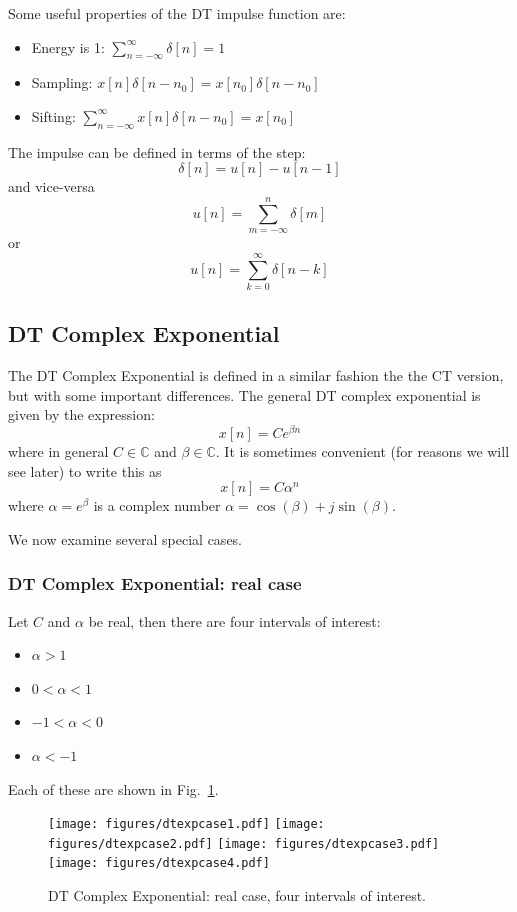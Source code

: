 Some useful properties of the DT impulse function are:

\begin{itemize}
\item Energy is 1: $\sum\limits_{n=-\infty}^{\infty} \delta[n] = 1$
\item Sampling: $x[n]\delta[n-n_0] = x[n_0]\delta[n-n_0]$
\item Sifting: $\sum\limits_{n=-\infty}^{\infty} x[n]\delta[n-n_0] = x[n_0]$
\end{itemize}

The impulse can be defined in terms of the step:
\[
\delta[n] = u[n] - u[n-1]
\]
and vice-versa
\[
u[n] = \sum\limits_{m=-\infty}^{n} \delta[m]
\]
or
\[
u[n] = \sum\limits_{k=0}^{\infty} \delta[n-k]
\]

\subsection{DT Complex Exponential}

The DT Complex Exponential is defined in a similar fashion the the CT version, but with some important differences. The general DT complex exponential is given by the expression:
\[
x[n] = Ce^{\beta n}
\]
where in general $C \in \mathbb{C}$ and $\beta \in \mathbb{C}$. It is sometimes convenient (for reasons we will see later) to write this as
\[
x[n] = C \alpha^n
\]
where $\alpha = e^{\beta}$ is a complex number $\alpha = \cos(\beta) + j\sin(\beta)$.

We now examine several special cases.

\subsubsection{DT Complex Exponential: real case}

Let $C$ and $\alpha$ be real, then there are four intervals of interest:

\begin{itemize}
\item $\alpha > 1$
\item $ 0 < \alpha < 1$
\item $-1 < \alpha < 0$
\item $\alpha < -1$
\end{itemize}

Each of these are shown in Fig.~\ref{fig:dtexpreal}.

\begin{figure}[ht]    
\texttt{[image: figures/dtexpcase1.pdf]}
\texttt{[image: figures/dtexpcase2.pdf]}
\texttt{[image: figures/dtexpcase3.pdf]}
\texttt{[image: figures/dtexpcase4.pdf]}
\caption{ DT Complex Exponential: real case, four intervals of interest.}
\label{fig:dtexpreal}
\end{figure}

